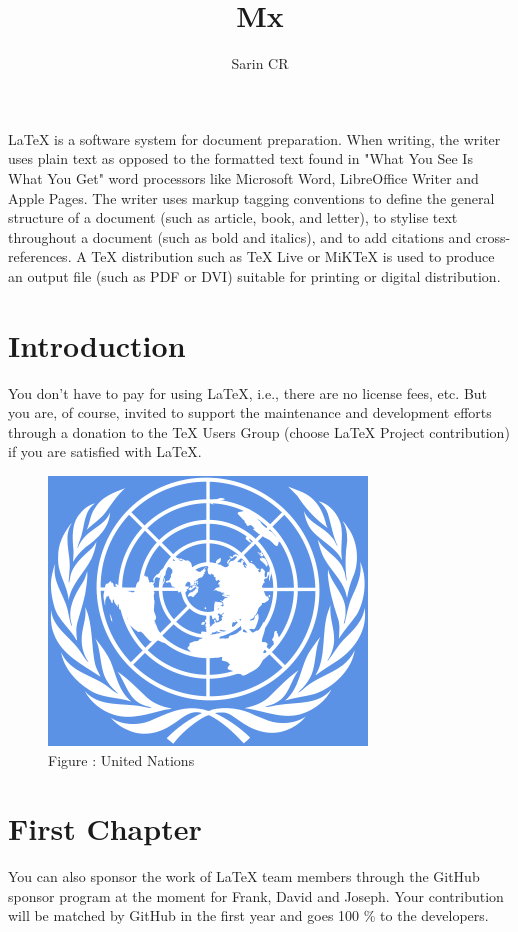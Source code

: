 \documentclass[10pt,a4paper]{article}
\title{Mx}
\author{Sarin CR}
\begin{document}
\maketitle
LaTeX  is a software system for document preparation. When writing, the writer uses plain text as opposed to the formatted text found in "What You See Is What You Get" word processors like Microsoft Word, LibreOffice Writer and Apple Pages. The writer uses markup tagging conventions to define the general structure of a document (such as article, book, and letter), to stylise text throughout a document (such as bold and italics), and to add citations and cross-references. A TeX distribution such as TeX Live or MiKTeX is used to produce an output file (such as PDF or DVI) suitable for printing or digital distribution. 

\section{Introduction}
You don't have to pay for using LaTeX, i.e., there are no license fees, etc. But you are, of course, invited to support the maintenance and development efforts through a donation to the TeX Users Group (choose LaTeX Project contribution) if you are satisfied with LaTeX.
\begin{figure}[hbtp]
\caption{Figure : United Nations }
\centering
\includegraphics[scale=1]{800px-Flag_of_the_United_Nations.svg.png}
\end{figure}
\section{First Chapter}
You can also sponsor the work of LaTeX team members through the GitHub sponsor program at the moment for Frank, David and Joseph. Your contribution will be matched by GitHub in the first year and goes 100 \% to the developers. 
\end{document}
